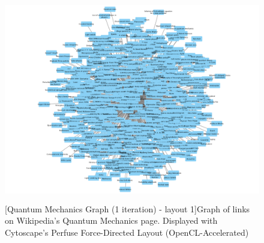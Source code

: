 \documentclass[man, 12pt, floatsintext, donotrepeattitle]{apa6}
\begin{document}
\begin{figure}[!b]
  \centering
    \includegraphics[width=6in, height=3.5in]{Resources/nolimit/1iteration/QuantumMechanics_v_618_e_617_b.png}
  [Quantum Mechanics Graph (1 iteration) - layout 1]{\fontsize{10pt}{12pt}\selectfont Graph of
  links on Wikipedia's Quantum Mechanics page.  Displayed with Cytoscape's
  Perfuse Force-Directed Layout (OpenCL-Accelerated)
    \label{fig:QuantumMechanics_v_618_e_617_b}}
\end{figure}
\end{document}
